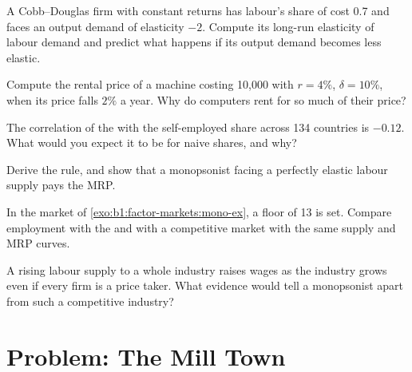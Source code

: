 \begin{exercise}[$\star\star$]\label{exo:b1:factor-markets:derived-ex}
A Cobb--Douglas firm with constant returns has labour's share of cost 0.7
and faces an output demand of elasticity $-2$. Compute its long-run
elasticity of labour demand and predict what happens if its output demand
becomes less elastic.
\end{exercise}

\begin{exercise}[$\star\star$]\label{exo:b1:factor-markets:rental}
Compute the rental price of a machine costing 10,000 with $r = 4\%$, $\delta = 10\%$,
when its price falls $2\%$ a year. Why do computers rent for so much of
their price?
\end{exercise}

\begin{exercise}[$\star\star$]\label{exo:b1:factor-markets:corr}
The correlation of the  with the self-employed share across
134 countries is $-0.12$. %
What would you expect it to be for naive shares, and why?
\end{exercise}

\begin{exercise}[$\star\star\star$]\label{exo:b1:factor-markets:derive}
Derive the  rule, and show that a monopsonist facing a perfectly
elastic labour supply pays the MRP.
\end{exercise}

\begin{exercise}[$\star\star\star$]\label{exo:b1:factor-markets:above}
In the market of \cref{exo:b1:factor-markets:mono-ex}, a floor of 13 is set.
Compare employment with the  and with a competitive market with
the same supply and MRP curves.
\end{exercise}

\begin{exercise}[$\star\star\star$]\label{exo:b1:factor-markets:separate}
A rising labour supply to a whole industry raises wages as the industry
grows even if every firm is a price taker. What evidence would tell a
monopsonist apart from such a competitive industry?
\end{exercise}

\section{Problem: The Mill Town}\label{sec:b1:factor-markets:problem}

